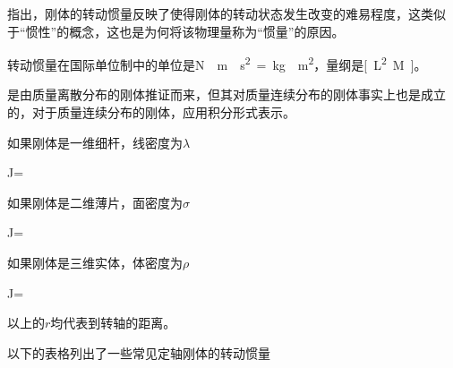 指出，刚体的转动惯量反映了使得刚体的转动状态发生改变的难易程度，这类似于“惯性”的概念，这也是为何将该物理量称为“惯量”的原因。

转动惯量在国际单位制中的单位是\si{N\cdot m\cdot s^{2}=kg\cdot m^2}，量纲是\si{[L^2M]}。

是由质量离散分布的刚体推证而来，但其对质量连续分布的刚体事实上也是成立的，对于质量连续分布的刚体，应用积分形式表示。
\begin{BoxGeneral}[连续体的转动惯量][定义]
    如果刚体是一维细杆，线密度为$\lambda$
    \begin{BoxEq}
        J=
    \end{BoxEq}
    如果刚体是二维薄片，面密度为$\sigma$
    \begin{BoxEq}
        J=
    \end{BoxEq}
    如果刚体是三维实体，体密度为$\rho$
    \begin{BoxEq}
        J=
    \end{BoxEq}
    以上的$r$均代表到转轴的距离。
\end{BoxGeneral}
以下的表格列出了一些常见定轴刚体的转动惯量
